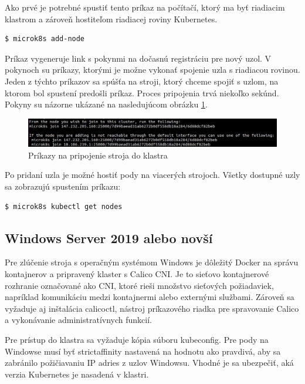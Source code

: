 Ako prvé je potrebné spustiť tento príkaz na počítačí, ktorý ma byť riadiacim klastrom a zároveň hostiteľom riadiacej roviny Kubernetes.

\begin{lstlisting}[language=Bash]
    $ microk8s add-node
    \end{lstlisting}

Príkaz vygeneruje link s pokynmi na dočasnú registráciu pre nový uzol. V pokynoch su príkazy, ktorými je možne vykonať spojenie uzla s riadiacou rovinou. Jeden z týchto príkazov sa spúšťa na stroji, ktorý chceme spojiť s uzlom, na ktorom bol spustení predošli príkaz. Proces pripojenia trvá niekoľko sekúnd. Pokyny su názorne ukázané na nasledujúcom obrázku \ref{pripojenie}.

\begin{figure}[!h]
    \centering
    \includegraphics[width=1\linewidth]{figures/addnode}
    \caption{Príkazy na pripojenie stroja do klastra}
    \label{pripojenie}
\end{figure}


Po pridaní uzla je možné hostiť pody na viacerých strojoch. Všetky dostupné uzly sa zobrazujú spustením príkazu:

\begin{lstlisting}[language=Bash]
    $ microk8s kubectl get nodes
    \end{lstlisting}

\subsection*{Windows Server 2019 alebo novší}

Pre zlúčenie stroja s operačným systémom Windows je dôležitý Docker na správu kontajnerov a pripravený klaster s Calico CNI. Je to sieťovo kontajnerové rozhranie označované ako CNI, ktoré rieši množstvo sieťových požiadaviek, napríklad komunikáciu medzi kontajnermi alebo externými službami. Zároveň sa vyžaduje aj inštalácia calicoctl, nástroj príkazového riadka pre spravovanie Calico a vykonávanie administratívnych funkcií.

Pre prístup do klastra sa vyžaduje kópia súboru kubeconfig. Pre pody na Windowse musí byť strictaffinity nastavená na hodnotu ako pravdivá, aby sa zabránilo požičiavaniu IP adries z uzlov Windowsu. Vhodné je sa ubezpečiť, aká verzia Kubernetes je nasadená v klastri.

